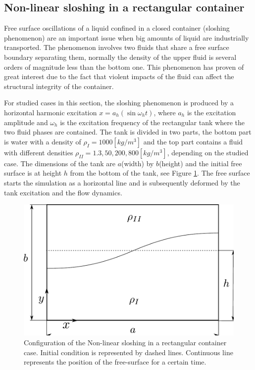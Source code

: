 \subsection{Non-linear sloshing in a rectangular container}%

Free surface oscillations of a liquid confined in a closed container (sloshing phenomenon) are an important issue when big amounts of liquid are industrially transported. The phenomenon involves two fluids that share a free surface boundary separating them, normally the density of the upper fluid is several orders of magnitude less than the bottom one. This phenomenon has proven of great interest due to the fact that violent impacts of the fluid can affect the structural integrity of the container.

For studied cases in this section, the sloshing phenomenon is produced by a horizontal harmonic excitation $x = a_h (\sin \omega_h t)$, where $a_h$ is the excitation amplitude and $\omega_h$ is the excitation frequency of the rectangular tank where the two fluid phases are contained. The tank is divided in two parts, the bottom part is water with a density of $\rho_{I} = 1000 [kg/m^3]$ and the top part contains a fluid with different densities $\rho_{II} = 1.3, 50, 200, 800 [kg/m^3]$, depending on the studied case. The dimensions of the tank are $a$(width) by $b$(height) and the initial free surface is at height $h$ from the bottom of the tank, see Figure \ref{fg:ansari-config}. The free surface starts the simulation as a horizontal line and is subsequently deformed by the tank excitation and the flow dynamics.

\begin{figure}[H]
  \begin{center}
      \includegraphics[width=.6\columnwidth]{images/ansari_config.pdf}
  \end{center}
  \caption{\label{fg:ansari-config} Configuration of the Non-linear sloshing in a rectangular container case. Initial condition is represented by dashed lines. Continuous line represents the position of the free-surface for a certain time.}
\end{figure}

